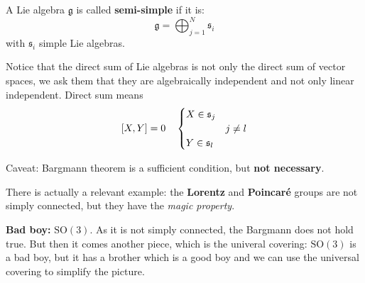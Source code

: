 \documentclass[../main.tex]{subfiles}
\begin{document}
\begin{definition}A Lie algebra $\mathfrak{g}$ is called \textbf{semi-simple} if it is:
\[
\mathfrak{g}=\bigoplus_{j=1}^N\mathfrak{s}_i
\]
with $\mathfrak{s}_i$ simple Lie algebras.
\end{definition}
\begin{kaobox}[frametitle=Remark]
Notice that the direct sum of Lie algebras is not only the direct sum of vector spaces, we ask them that they are algebraically independent and not only linear independent. Direct sum means
\[
\comm{X}{Y}=0\quad \begin{cases}
X\in\mathfrak{s}_j&\\
&j\neq l\\
Y\in\mathfrak{s}_l&
\end{cases}
\]
\end{kaobox}
{\selectfont{}\relax} Caveat: Bargmann theorem is a sufficient condition, but \textbf{not necessary}.

There is actually a relevant example: the \textbf{Lorentz} and \textbf{Poincaré} groups are not simply connected, but they have the \textit{magic property}.

\textbf{Bad boy:} $\textrm{SO}(3)$. As it is not simply connected, the Bargmann  does not hold true. But then it comes another piece, which is the univeral covering: $\textrm{SO}(3)$ is a bad boy, but it has a brother which is a good boy and we can use the universal covering to simplify the picture.
\end{document}
